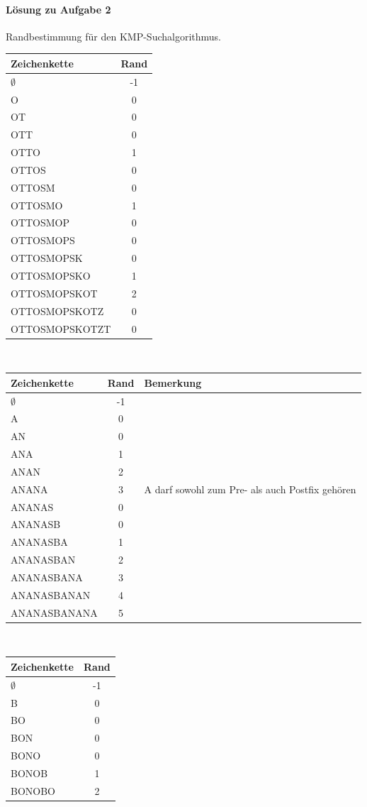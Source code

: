 \documentclass[11pt,a4paper]{scrartcl}
\begin{document}
\paragraph{Lösung zu Aufgabe 2}
\label{a2.2:lsg}
Randbestimmung für den KMP-Suchalgorithmus. \\
\begin{center}
\begin{tabular}{|l|c|}
\hline
Zeichenkette & Rand \\
\hline
$\emptyset$ & -1 \\
O & 0 \\
OT & 0 \\
OTT & 0 \\
OTTO & 1 \\
OTTOS & 0 \\
OTTOSM & 0 \\
OTTOSMO & 1 \\
OTTOSMOP & 0 \\
OTTOSMOPS & 0 \\
OTTOSMOPSK & 0 \\
OTTOSMOPSKO & 1 \\
OTTOSMOPSKOT & 2 \\
OTTOSMOPSKOTZ & 0 \\
OTTOSMOPSKOTZT & 0 \\
\hline
\end{tabular} \\
\begin{tabular}{|l|c|l|}
\hline
Zeichenkette & Rand & Bemerkung \\
\hline
$\emptyset$ & -1 \\
A & 0 &\\
AN & 0 &\\
ANA & 1 &\\
ANAN & 2 &\\
ANANA & 3 & A darf sowohl zum Pre- als auch Postfix gehören  \\
ANANAS & 0 &\\
ANANASB & 0 &\\
ANANASBA & 1 &\\
ANANASBAN & 2 &\\
ANANASBANA & 3 &\\
ANANASBANAN & 4 &\\
ANANASBANANA & 5 &\\
\hline
\end{tabular} \\
\begin{tabular}{|l|c|}
\hline
Zeichenkette & Rand \\
\hline
$\emptyset$ & -1 \\
B & 0 \\
BO & 0 \\
BON & 0 \\
BONO & 0 \\
BONOB & 1 \\
BONOBO & 2 \\
\hline
\end{tabular} \\
\end{center}
\end{document}
